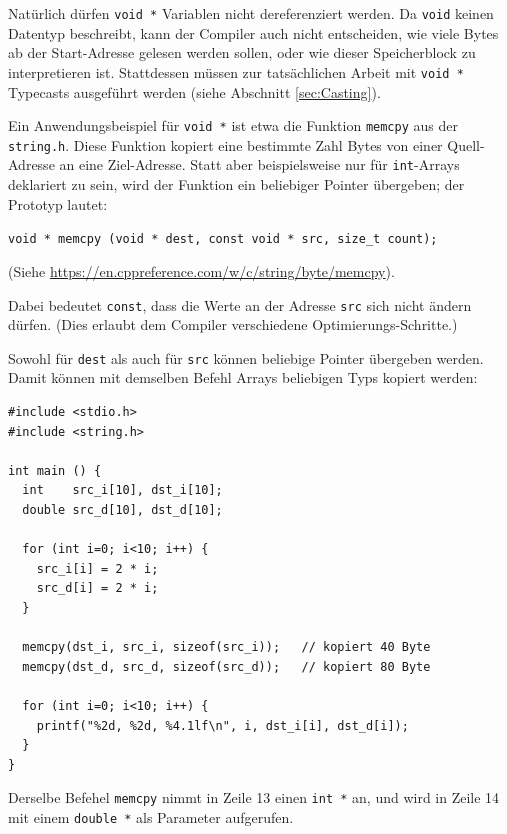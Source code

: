 Natürlich dürfen \texttt{void *} Variablen nicht dereferenziert werden. Da \texttt{void} keinen Datentyp beschreibt, kann der Compiler auch nicht entscheiden, wie viele Bytes ab der Start-Adresse gelesen werden sollen, oder wie dieser Speicherblock zu interpretieren ist. Stattdessen müssen zur tatsächlichen Arbeit mit \texttt{void *} Typecasts ausgeführt werden (siehe Abschnitt \ref{sec:Casting}).

Ein Anwendungsbeispiel für \texttt{void *} ist etwa die Funktion \texttt{memcpy} aus der \texttt{string.h}. Diese Funktion kopiert eine bestimmte Zahl Bytes von einer Quell-Adresse an eine Ziel-Adresse. Statt aber beispielsweise nur für \texttt{int}-Arrays deklariert zu sein, wird der Funktion ein beliebiger Pointer übergeben; der Prototyp lautet:

\begin{center}
\texttt{void * memcpy (void * dest, const void * src, size_t count);}
\end{center}

(Siehe \url{https://en.cppreference.com/w/c/string/byte/memcpy}). 

Dabei bedeutet \texttt{const}, dass die Werte an der Adresse \texttt{src} sich nicht ändern dürfen. (Dies erlaubt dem Compiler verschiedene Optimierungs-Schritte.)

Sowohl für \texttt{dest} als auch für \texttt{src} können beliebige Pointer übergeben werden. Damit können mit demselben Befehl Arrays beliebigen Typs kopiert werden:

\begin{codebox}
\begin{verbatim}
#include <stdio.h>
#include <string.h>

int main () {
  int    src_i[10], dst_i[10];
  double src_d[10], dst_d[10];
  
  for (int i=0; i<10; i++) {
    src_i[i] = 2 * i;
    src_d[i] = 2 * i;
  }
  
  memcpy(dst_i, src_i, sizeof(src_i));   // kopiert 40 Byte
  memcpy(dst_d, src_d, sizeof(src_d));   // kopiert 80 Byte
  
  for (int i=0; i<10; i++) {
    printf("%2d, %2d, %4.1lf\n", i, dst_i[i], dst_d[i]);
  }
}
\end{verbatim}
\end{codebox}

Derselbe Befehel \texttt{memcpy} nimmt in Zeile 13 einen \texttt{int *} an, und wird in Zeile 14 mit einem \texttt{double *} als Parameter aufgerufen.

